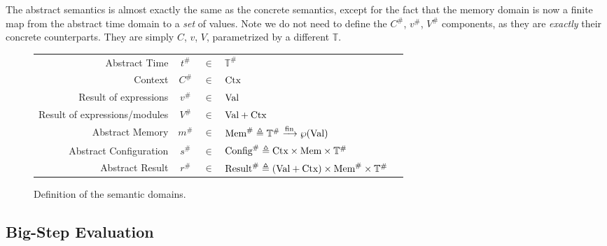 \documentclass[acmsmall,screen,review]{acmart}
\theoremstyle{definition}
\newcommand*{\A}[1]{{#1}^{\#}}
\newcommand*{\Time}{\mathbb{T}}
\newcommand*{\ATime}{\A{\Time}}
\newcommand*{\Ctx}[1]{\text{Ctx}\vphantom{#1}}
\newcommand*{\Value}[1]{\text{Val}\vphantom{#1}}
\newcommand*{\Mem}[1]{\text{Mem}\vphantom{#1}}
\newcommand*{\mem}{m}
\newcommand*{\AMem}[1]{\A{\text{Mem}}\vphantom{#1}}
\newcommand*{\AConfig}[1]{\A{\text{Config}}\vphantom{#1}}
\newcommand*{\AResult}[1]{\A{\text{Result}}\vphantom{#1}}
\newcommand*{\fin}[2]{{#1}\xrightarrow{\text{fin}}{#2}}
\begin{document}
The abstract semantics is almost exactly the same as the concrete semantics, except for the fact that the memory domain is now a finite map from the abstract time domain to a \emph{set} of values.
Note we do not need to define the $\A{C}$, $\A{v}$, $\A{V}$ components, as they are \emph{exactly} their concrete counterparts.
They are simply $C$, $v$, $V$, parametrized by a different $\Time$.

\begin{figure}[htb]
  \centering
  \footnotesize
  \begin{tabular}{rccll}
    Abstract Time                 & $\A{t}$  & $\in$ & $\ATime$                                                                                   \\
    Context                       & $\A{C}$  & $\in$ & $\Ctx\ATime$                                                                               \\
    Result of expressions         & $\A{v}$  & $\in$ & $\Value\ATime$                                                                             \\
    Result of expressions/modules & $\A{V}$  & $\in$ & $\Value{\ATime}+\Ctx{\ATime}$                                                              \\
    Abstract Memory               & $\A\mem$ & $\in$ & $\AMem{\ATime} \triangleq \fin{\ATime}{\wp(\Value{\ATime})}$                               \\
    Abstract Configuration        & $\A{s}$  & $\in$ & $\AConfig{\ATime} \triangleq \Ctx{\ATime}\times\Mem{\ATime}\times\ATime$                   \\
    Abstract Result               & $\A{r}$  & $\in$ & $\AResult{\ATime} \triangleq (\Value{\ATime}+\Ctx{\ATime})\times\AMem{\ATime}\times\ATime$ \\
  \end{tabular}
  \caption{Definition of the semantic domains.}
\end{figure}

\subsection{Big-Step Evaluation}
\end{document}
